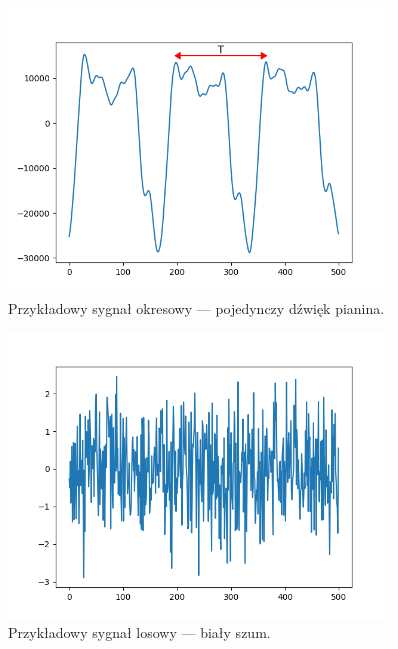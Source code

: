 \begin{figure}[htb]
    \centering
    \includegraphics[width=0.9\textwidth]{images/sygnal_okresowy}
    \caption{Przykładowy sygnał okresowy --- pojedynczy dźwięk pianina.}
    \label{fig:sygnal_okresowy}
\end{figure}

\begin{figure}[htb]
    \centering
    \includegraphics[width=0.9\textwidth]{images/sygnal_losowy}
    \caption{Przykładowy sygnał losowy --- biały szum.}
    \label{fig:sygnal_losowy}
\end{figure}

